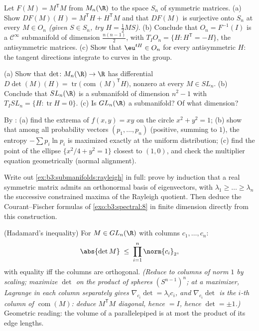 \begin{exercise}[$\star\star$]\label{exo:b3:submanifolds:5}
Let $F(M) = M^{\mathsf T}M$ from $M_n(\R)$ to the space
$S_n$ of symmetric matrices.
(a) Show $DF(M)(H) = M^{\mathsf T}H + H^{\mathsf T}M$ and
that $DF(M)$ is surjective onto $S_n$ at every $M \in O_n$
\emph{(given $S \in S_n$, try $H = \frac12MS$)}.
(b) Conclude that $O_n = F^{-1}(I)$ is a 
$\mathcal C^\infty$ submanifold of dimension
$\frac{n(n-1)}2$, with $T_IO_n = \{H : H^{\mathsf T} = -H\}$,
the antisymmetric matrices.
(c) Show that $\eu^{tH} \in O_n$ for every antisymmetric $H$:
the tangent directions integrate to curves in the group.
\end{exercise}

\begin{exercise}[$\star\star$]\label{exo:b3:submanifolds:6}
(a) Show that $\det \colon M_n(\R) \to \R$ has differential
$D\det(M)(H) = \operatorname{tr}\bigl(\operatorname{com}(M)
^{\mathsf T}H\bigr)$, nonzero at every $M \in SL_n$.
(b) Conclude that $SL_n(\R)$ is a submanifold of dimension
$n^2 - 1$ with $T_ISL_n = \{H : \operatorname{tr}H = 0\}$.
(c) Is $GL_n(\R)$ a submanifold? Of what dimension?
\end{exercise}

\begin{exercise}[$\star\star$]\label{exo:b3:submanifolds:7}
By :
(a) find the extrema of $f(x,y) = xy$ on the circle $x^2 +
y^2 = 1$;
(b) show that among all probability vectors $(p_1, \dots,
p_n)$ (positive, summing to $1$), the entropy $-\sum
p_i\ln p_i$ is maximized exactly at the uniform distribution;
(c) find the point of the ellipse $\{x^2/4 + y^2 = 1\}$
closest to $(1, 0)$, and check the multiplier equation
geometrically (normal alignment).
\end{exercise}

\begin{exercise}[$\star\star\star$]\label{exo:b3:submanifolds:8}
Write out \cref{ex:b3:submanifolds:rayleigh} in full: prove
by induction that a real symmetric matrix admits an
orthonormal basis of eigenvectors, with
$\lambda_1 \geq \dots \geq \lambda_n$ the successive
constrained maxima of the Rayleigh quotient. Then deduce the
Courant--Fischer formulas of \cref{exo:b3:spectral:8} in
finite dimension directly from this construction.
\end{exercise}

\begin{exercise}[$\star\star\star$]\label{exo:b3:submanifolds:9}
(Hadamard's inequality) For $M \in GL_n(\R)$ with columns
$c_1, \dots, c_n$:
\[
\abs{\det M} \;\leq\; \prod_{i=1}^n\norm{c_i}_2 ,
\]
with equality iff the columns are orthogonal. \emph{(Reduce
to columns of norm $1$ by scaling; maximize $\det$ on the
 product of spheres $(S^{n-1})^n$; at a maximizer,
Lagrange in each column separately gives $\nabla_{c_i}\det =
\lambda_ic_i$, and $\nabla_{c_i}\det$ is the $i$-th column of
$\operatorname{com}(M)$: deduce $M^{\mathsf T}M$ diagonal,
hence $= I$, hence $\det = \pm1$.)} Geometric reading: the
volume of a parallelepiped is at most the product of its edge
lengths.
\end{exercise}

